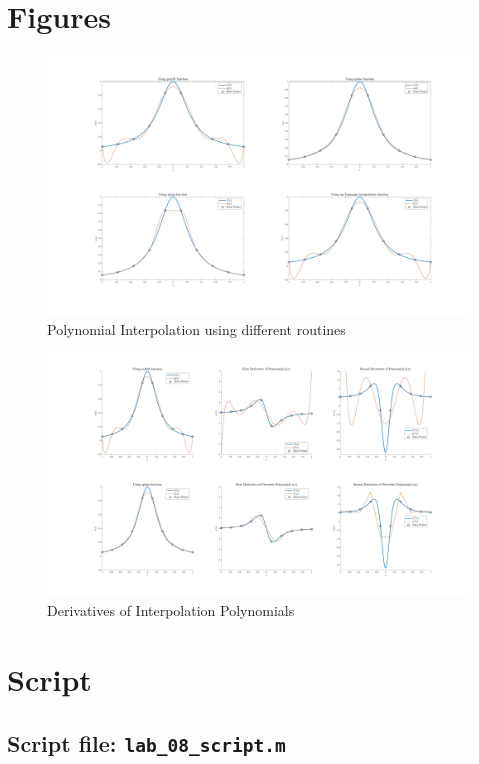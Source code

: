 \section{Figures}

\begin{figure}[!hbtp]
    \centering
    \includegraphics[width=\textwidth]{../src/lab_08_figure_01.pdf}
    \caption{Polynomial Interpolation using different routines}
    \label{fig:my_label}
\end{figure}

\begin{figure}[!hbtp]
    \centering
    \includegraphics[width=\textwidth]{../src/lab_08_figure_02.pdf}
    \caption{Derivatives of Interpolation Polynomials}
    \label{fig:my_label}
\end{figure}
\newpage
\section{Script}
\subsection{Script file: \lstinline[style=Plain]{lab_08_script.m}}

